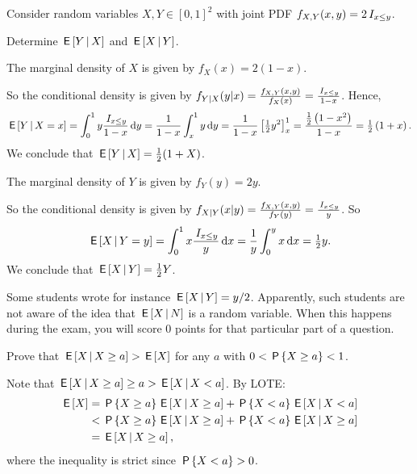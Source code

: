 \documentclass[assignments]{subfiles}
\begin{document}
\begin{exercise}
Consider random variables $X, Y \in [0,1]^2$ with joint PDF $f_{X,Y}(x,y) = 2 \1{x \leq y}$.

Determine $\E{Y \given X}$ and $\E{X \given Y}$.
\begin{solution}
The marginal density of $X$ is given by $f_X(x) = 2(1-x)$.

So the conditional density is given by $f_{Y|X}(y|x) = \frac{f_{X,Y}(x,y)}{f_X(x)} = \frac{\1{x \leq y}}{1-x}$. Hence,
\begin{equation*}
\E{Y \given X = x} = \int_0^1 y \frac{\1{x \leq y}}{1-x} \d y  = \frac1{1-x}  \int_x^1 y \d y = \frac1{1-x} \left[\tfrac12y^2\right]_x^1 = \frac{\tfrac12\left(1-x^2\right)}{1-x} =  \tfrac12 \left(1+x\right) .
\end{equation*}
We conclude that $\E{Y \given X} = \tfrac12(1+X)$.


The marginal density of $Y$ is given by $f_Y(y) = 2y$.

So the conditional density is given by $f_{X|Y}(x|y) = \frac{f_{X,Y}(x,y)}{f_Y(y)} = \frac{\1{x \leq y}}{y}$. So
\begin{equation*}
\E{X \given Y = y} = \int_0^1 x \frac{\1{x \leq y}}{y} \d x  = \frac1{y}   \int_0^y x \d x = \tfrac12 y.
\end{equation*}
We conclude that $\E{X \given Y} = \tfrac12Y$.

Some students wrote for instance $\E{X\given Y} = y/2$.
Apparently, such students are not aware of the idea that $\E{X\given N}$ is a random variable.
When this happens during the exam, you will score 0 points for that particular part of a question.

\end{solution}
\end{exercise}





\begin{exercise}
Prove that $\E{X \given X \geq a} > \E{X}$ for any $a$ with $0 < \P{X \geq a} < 1$.
\begin{solution}
Note that $\E{X \given X \geq a} \geq a > \E{X \given X < a}$. By LOTE:
\begin{align*}
\E{X} &= \P{X \geq a}  \E{X \given X \geq a} + \P{X <a}  \E{X \given X < a}
\\  &< \P{X \geq a}  \E{X \given X \geq a} + \P{X <a}  \E{X \given X \geq a}
\\  &= \E{X \given X \geq a},
\end{align*}
where the inequality is strict since $ \P{X <a} > 0$.
\end{solution}
\end{exercise}
\end{document}
